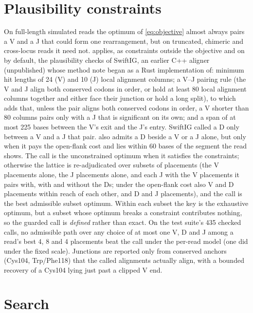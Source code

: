 \documentclass[11pt,a4paper]{article}
\begin{document}
\section{Plausibility constraints}
\label{sec:guards}

On full-length simulated reads the optimum of \cref{eq:objective} almost
always pairs a V and a J that could form one rearrangement, but on
truncated, chimeric and cross-locus reads it need not. \swig{} applies, as
constraints outside the objective and on by default, the plausibility checks
of SwiftIG, an earlier C++ aligner (unpublished) whose method note \swig{}
began as a Rust implementation of: minimum hit lengths of 24 (V) and 10 (J)
local alignment columns; a V--J pairing rule (the V and J align both
conserved codons in order, or hold at least 80 local alignment columns
together and either face their junction or hold a long split), to which
\swig{} adds that, unless the pair aligns both conserved codons in order, a
V shorter than 80 columns pairs only with a J that is significant on its
own; and a span of at most 225 bases between the V's
exit and the J's entry. SwiftIG called a D only between a V and a J that
pair. \swig{} also admits a D beside a V or a J alone, but only when it pays
the open-flank cost and lies within 60 bases of the segment the read shows.
The call is the unconstrained optimum when it satisfies the constraints;
otherwise the lattice is re-adjudicated over subsets of placements (the V
placements alone, the J placements alone, and each J with the V placements
it pairs with, with and without the Ds; under the open-flank cost also V and
D placements within reach of each other, and D and J placements), and the
call is the best admissible subset optimum. Within each subset the key is the
exhaustive optimum, but a subset whose optimum breaks a constraint
contributes nothing, so the guarded call is \emph{defined} rather than exact.
On the test suite's 435 checked calls, no admissible path over any choice of
at most one V, D and J among a read's best 4, 8 and 4 placements beat the
call under the per-read model (one did under the fixed scale). Junctions are
reported only from conserved anchors
(Cys104, Trp/Phe118) that the called alignments actually align, with a
bounded recovery of a Cys104 lying just past a clipped V end.

\section{Search}
\label{sec:search}
\end{document}
